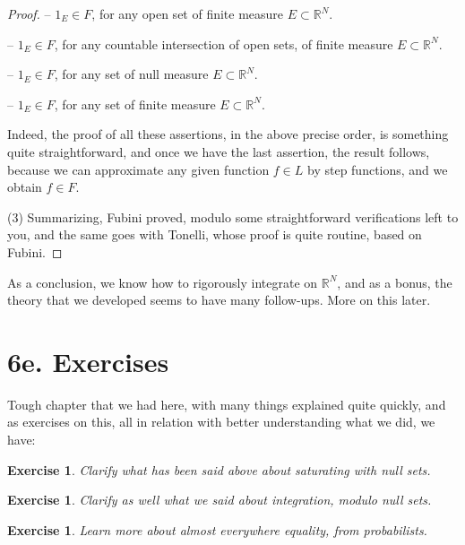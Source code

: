 \documentclass[12pt]{amsbook}
\newtheorem{exercise}[theorem]{Exercise}
\begin{document}
\begin{proof}
\medskip

-- $1_E\in F$, for any open set of finite measure $E\subset\mathbb R^N$.

\medskip

-- $1_E\in F$, for any countable intersection of open sets, of finite measure $E\subset\mathbb R^N$.

\medskip

-- $1_E\in F$, for any set of null measure $E\subset\mathbb R^N$.

\medskip

-- $1_E\in F$, for any set of finite measure $E\subset\mathbb R^N$.

\medskip

Indeed, the proof of all these assertions, in the above precise order, is something quite straightforward, and once we have the last assertion, the result follows, because we can approximate any given function $f\in L$ by step functions, and we obtain $f\in F$.

\medskip

(3) Summarizing, Fubini proved, modulo some straightforward verifications left to you, and the same goes with Tonelli, whose proof is quite routine, based on Fubini.
\end{proof}

As a conclusion, we know how to rigorously integrate on $\mathbb R^N$, and as a bonus, the theory that we developed seems to have many follow-ups. More on this later. 

\section*{6e. Exercises}

Tough chapter that we had here, with many things explained quite quickly, and as exercises on this, all in relation with better understanding what we did, we have:

\begin{exercise}
Clarify what has been said above about saturating with null sets.
\end{exercise}

\begin{exercise}
Clarify as well what we said about integration, modulo null sets.
\end{exercise}

\begin{exercise}
Learn more about almost everywhere equality, from probabilists.
\end{exercise}
\end{document}
